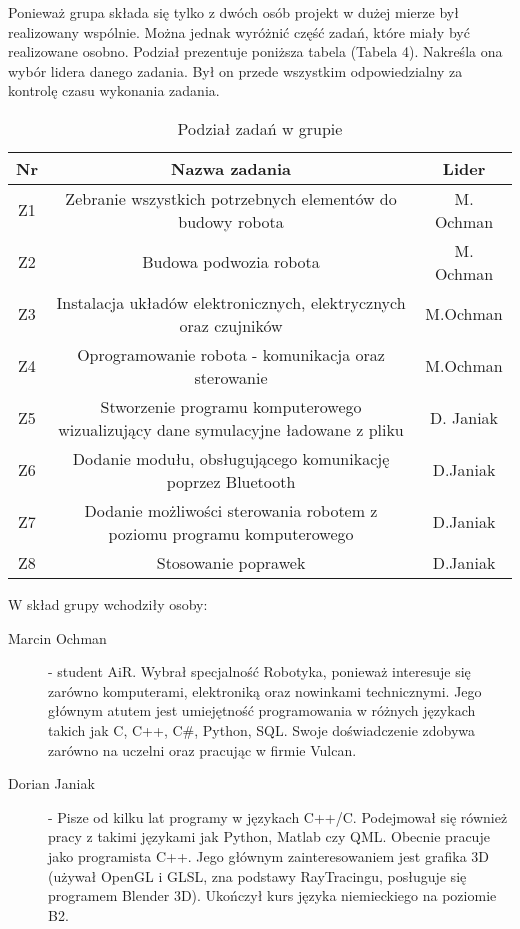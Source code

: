 Ponieważ grupa składa się tylko z dwóch osób projekt w dużej mierze był realizowany wspólnie. Można  jednak wyróżnić część zadań, które miały być realizowane osobno. Podział prezentuje poniższa tabela (Tabela 4). Nakreśla ona wybór lidera danego zadania. Był on przede wszystkim odpowiedzialny za kontrolę czasu wykonania zadania.


\begin{table}[!htbp]
\begin{center}
\begin{tabular}{|c|c|c|}

\hline
\textbf{Nr} & \textbf{Nazwa zadania} & \textbf{Lider} \\ \hline\hline
Z1 & Zebranie wszystkich potrzebnych elementów do budowy robota & M. Ochman \\ \hline
Z2 & Budowa podwozia robota & M. Ochman \\ \hline
Z3 & Instalacja układów elektronicznych, elektrycznych oraz czujników & M.Ochman \\ \hline
Z4 & Oprogramowanie robota - komunikacja oraz sterowanie & M.Ochman \\ \hline
Z5 &Stworzenie programu komputerowego wizualizujący dane symulacyjne ładowane z pliku & D. Janiak \\ \hline
Z6 & Dodanie modułu, obsługującego komunikację poprzez Bluetooth & D.Janiak \\ \hline
Z7 & Dodanie możliwości sterowania robotem z poziomu programu komputerowego & D.Janiak \\ \hline
Z8 & Stosowanie poprawek & D.Janiak \\ \hline


\end{tabular}
\caption{Podział zadań w grupie}
\end{center}
\end{table}

W skład grupy wchodziły osoby:
\begin{description}
\item[Marcin Ochman] - student AiR. Wybrał specjalność Robotyka, ponieważ interesuje się zarówno komputerami, elektroniką oraz nowinkami technicznymi.
	Jego głównym atutem jest umiejętność programowania w różnych językach takich jak C, C++, C\#, Python, SQL. 
	Swoje doświadczenie zdobywa zarówno na uczelni oraz pracując w firmie Vulcan.	
\item[Dorian Janiak] - Pisze od kilku lat programy w językach C++/C. Podejmował się również pracy z takimi językami jak Python, Matlab czy QML. Obecnie pracuje jako programista C++. Jego głównym zainteresowaniem jest grafika 3D (używał OpenGL i GLSL, zna podstawy RayTracingu, posługuje się programem Blender 3D). Ukończył kurs języka niemieckiego na poziomie B2.
\end{description}
